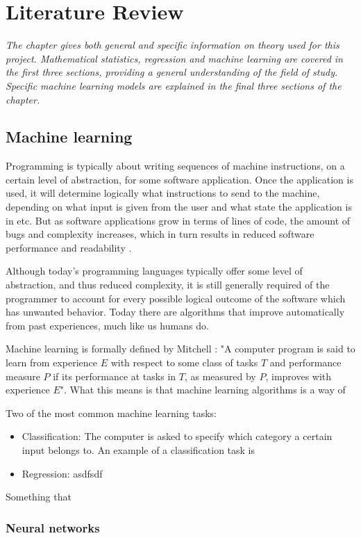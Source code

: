 \chapter{Literature Review}
\emph{The chapter gives both general and specific information on theory used for this project.  Mathematical statistics, regression and machine learning are covered in the first three sections, providing a general understanding of the field of study. Specific machine learning models are explained in the final three sections of the chapter. }


\section{Machine learning}
	Programming is typically about writing sequences of machine instructions, on a certain level of abstraction, for some software application. Once the application is used, it will determine logically what instructions to send to the machine, depending on what input is given from the user and what state the application is in etc. But as software applications grow in terms of lines of code, the amount of bugs and complexity increases, which in turn results in reduced software performance and readability \cite{IP:1}. 

Although today's programming languages typically offer some level of abstraction, and thus reduced complexity, it is still generally required of the programmer to account for every possible logical outcome of the software which has unwanted behavior. Today there are algorithms that improve automatically from past experiences, much like us humans do.

	
Machine learning is formally defined by Mitchell \cite{BOOK:2}: 
	"A computer program is said to learn from experience $E$ with respect to some class of tasks $T$ and performance measure $P$ if its performance at tasks in $T$, as measured by $P$, improves with experience $E$".
	What this means is that machine learning algorithms is a way of 
	
	Two of the most common machine learning tasks: 
	\begin{itemize}
		\item{Classification:} The computer is asked to specify which category a certain input belongs to. An example of a classification task is  
		\item{Regression:} asdfsdf
	\end{itemize} \cite{BOOK:1}
	Something that \cite{WEBSITE:1}
\subsection{Neural networks}

